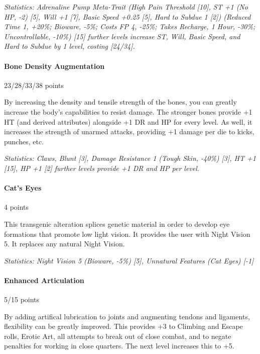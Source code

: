 \begin{multicols*}{3}
	\textit{\textcolor{OliveGreen}{Statistics: Adrenaline Pump Meta-Trait (High Pain Threshold [10], ST +1 (No HP, -2) [5], Will +1 [7], Basic Speed +0.25 [5], Hard to Subdue 1 [2]) (Reduced Time 1, +20\%; Bioware, -5\%; Costs FP 4, -25\%; Takes Recharge, 1 Hour, -30\%; Uncontrollable,  -10\%) [15] further levels increase ST, Will, Basic Speed, and Hard to Subdue by 1 level, costing  [24/34].}}
	
	\paragraph{Bone Density Augmentation}
	\begin{flushright}
		23/28/33/38 points
	\end{flushright}
	
	By increasing the density and tensile strength of the bones, you can greatly increase the body's capabilities to resist damage. The stronger bones provide +1 HT (and derived attributes) alongside +1 DR and HP for every level. As well, it increases the strength of unarmed attacks, providing +1 damage per die to kicks, punches, etc.
	
	\textit{\textcolor{OliveGreen}{Statistics: Claws, Blunt [3], Damage Resistance 1 (Tough Skin, -40\%) [3], HT +1 [15], HP +1 [2] further levels provide +1 DR and HP per level.}}
	
	\paragraph{Cat's Eyes}
	\begin{flushright}
		4 points
	\end{flushright}
	
	This transgenic alteration splices genetic material in order to develop eye formations that promote low light vision. It provides the user with Night Vision 5. It replaces any natural Night Vision.
	
	\textit{\textcolor{OliveGreen}{Statistics: Night Vision 5 (Bioware, -5\%) [5], Unnatural Features (Cat Eyes) [-1]}}
	
	\paragraph{Enhanced Articulation}
	\begin{flushright}
		5/15 points
	\end{flushright}
	
	By adding artifical lubrication to joints and augmenting tendons and ligaments, flexibility can be greatly improved. This provides +3 to Climbing and Escape rolls, Erotic Art, all attempts to break out of close combat, and to negate penalties for working in close quarters. The next level increases this to +5.
	

\end{multicols*}
